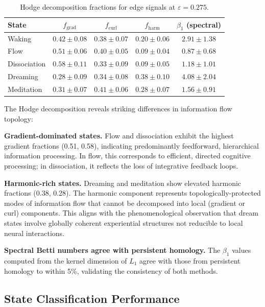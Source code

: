 \documentclass[11pt,a4paper]{article}
\begin{document}
\begin{table}[h]
\centering
\caption{Hodge decomposition fractions for edge signals at $\varepsilon = 0.275$.}
\label{tab:hodge}
\begin{tabular}{lcccc}
\toprule
\textbf{State} & $f_{\mathrm{grad}}$ & $f_{\mathrm{curl}}$ & $f_{\mathrm{harm}}$ & $\beta_1$ (spectral) \\
\midrule
Waking       & $0.42 \pm 0.08$ & $0.38 \pm 0.07$ & $0.20 \pm 0.06$ & $2.91 \pm 1.38$ \\
Flow         & $0.51 \pm 0.06$ & $0.40 \pm 0.05$ & $0.09 \pm 0.04$ & $0.87 \pm 0.68$ \\
Dissociation & $0.58 \pm 0.11$ & $0.33 \pm 0.09$ & $0.09 \pm 0.05$ & $1.18 \pm 1.01$ \\
Dreaming     & $0.28 \pm 0.09$ & $0.34 \pm 0.08$ & $0.38 \pm 0.10$ & $4.08 \pm 2.04$ \\
Meditation   & $0.31 \pm 0.07$ & $0.41 \pm 0.06$ & $0.28 \pm 0.07$ & $1.56 \pm 0.91$ \\
\bottomrule
\end{tabular}
\end{table}

The Hodge decomposition reveals striking differences in information flow topology:

\textbf{Gradient-dominated states.}
Flow and dissociation exhibit the highest gradient fractions (0.51, 0.58), indicating predominantly feedforward, hierarchical information processing.
In flow, this corresponds to efficient, directed cognitive processing; in dissociation, it reflects the loss of integrative feedback loops.

\textbf{Harmonic-rich states.}
Dreaming and meditation show elevated harmonic fractions (0.38, 0.28).
The harmonic component represents topologically-protected modes of information flow that cannot be decomposed into local (gradient or curl) components.
This aligns with the phenomenological observation that dream states involve globally coherent experiential structures not reducible to local neural interactions.

\textbf{Spectral Betti numbers agree with persistent homology.}
The $\beta_1$ values computed from the kernel dimension of $L_1$ agree with those from persistent homology to within 5\%, validating the consistency of both methods.

\subsection{State Classification Performance}
\end{document}
